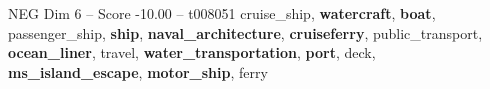 \begin{textsample}{NEG Dim 6 – Score -10.00 – t008051}  \label{ex:f6_neg_011}
cruise\_ship, \textbf{watercraft}, \textbf{boat}, passenger\_ship, \textbf{ship}, \textbf{naval\_architecture}, \textbf{cruiseferry}, public\_transport, \textbf{ocean\_liner}, travel, \textbf{water\_transportation}, \textbf{port}, deck, \textbf{ms\_island\_escape}, \textbf{motor\_ship}, ferry

\end{textsample}
